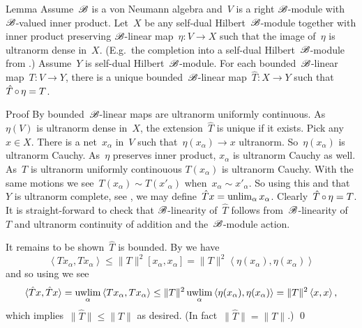 \documentclass[b]{subfiles}
\begin{document}
\begin{parsec}%
\begin{point}{Lemma}%
Assume~$\mathscr{B}$ is a von Neumann algebra
    and~$V$ is a right $\mathscr{B}$-module
    with~$\mathscr{B}$-valued inner product.
Let~$X$ be any self-dual Hilbert~$\mathscr{B}$-module
    together with inner product preserving
    $\mathscr{B}$-linear map~$\eta\colon V \to X$
    such that the image of~$\eta$ is ultranorm dense in~$X$.
(E.g.~the completion into a self-dual Hilbert~$\mathscr{B}$-module
from .)
Assume~$Y$ is self-dual Hilbert~$\mathscr{B}$-module.
For each bounded~$\mathscr{B}$-linear
    map~$T\colon V \to Y$,
    there is a unique bounded~$\mathscr{B}$-linear
    map~$\hat{T} \colon X \to Y$
    such that~$\hat{T} \mathop{\circ} \eta = T$.
\begin{point}{Proof}%
By  bounded~$\mathscr{B}$-linear
    maps are ultranorm uniformly continuous.
As~$\eta(V)$ is ultranorm dense in~$X$,
    the extension~$\hat{T}$ is unique if it exists.
Pick any~$x \in X$.
There is a net~$x_\alpha$ in~$V$ such
    that~$\eta(x_\alpha) \to x$ ultranorm.
So~$\eta(x_\alpha)$ is ultranorm Cauchy.
As~$\eta$ preserves inner product,
    $x_\alpha$ is ultranorm Cauchy as well.
As~$T$ is ultranorm uniformly continouous
    $T(x_\alpha)$ is ultranorm Cauchy.
With the same motions we see~$T(x_\alpha) \sim T(x'_\alpha)$
    when~$x_\alpha \sim x'_\alpha$.
So using this and that~$Y$ is ultranorm complete, see ,
    we may define~$\hat{T} x = \unlim_\alpha x_\alpha$.
Clearly~$\hat{T}\mathop{\circ}\eta=T$.
It is straight-forward to check
    that $\mathscr{B}$-linearity
    of~$\hat{T}$
    follows from~$\mathscr{B}$-linearity of~$T$
    and ultranorm continuity of addition and
        the~$\mathscr{B}$-module action.

It remains to be shown~$\hat{T}$ is bounded.
By   we have
\begin{equation*}
\left<T x_\alpha,T x_\alpha\right>
\leq \| T\|^2 [x_\alpha,x_\alpha]
= \|T\|^2 \left<\eta(x_\alpha),\eta(x_\alpha)\right>
\end{equation*}
and so using  we see
\begin{equation*}
\langle\hat{T} x, \hat{T} x\rangle =
\uwlim_\alpha \left<T x_\alpha, T x_\alpha\right>
            \leq \|T\|^2 \uwlim_\alpha \left<\eta(x_\alpha), \eta(x_\alpha)\right>
            = \|T\|^2 \left<x,x\right>,
\end{equation*}
which implies~$\|\hat{T}\| \leq \|T\|$ as desired.
(In fact~$\|\hat{T}\| = \|T\|$.) \qed
\end{point}
\end{point}
\end{parsec}
\end{document}
